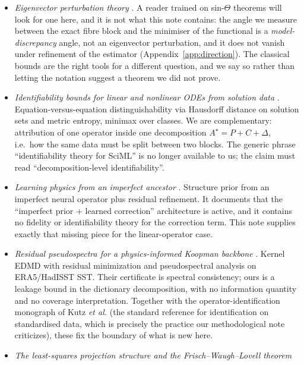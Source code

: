 \documentclass[11pt]{article}
\theoremstyle{remark}
\begin{document}
\begin{itemize}
\cite{welch1974}. None of these is offered as a contribution here; what is offered is that the
amplification factor of the attribution error \emph{is} $1/\sin\alpha$, with constant one.
\item \emph{Eigenvector perturbation theory} \cite{daviskahan1970,wedin1972,kato1995}. A reader
trained on sin-$\Theta$ theorems will look for one here, and it is not what this note contains: the
angle we measure between the exact fibre block and the minimiser of the functional is a
\emph{model-discrepancy} angle, not an eigenvector perturbation, and it does not vanish under
refinement of the estimator (Appendix~\ref{app:direction}). The classical bounds are the right
tools for a different question, and we say so rather than letting the notation suggest a theorem we
did not prove.
\item \emph{Identifiability bounds for linear and nonlinear ODEs from solution data}
\cite{pan2026}. Equation-versus-equation distinguishability via
Hausdorff distance on solution sets and metric entropy, minimax over classes. We are
complementary: attribution of one operator inside one decomposition
$A^\star=P+C+\Delta$, i.e.\ how the same data must be split between two blocks. The
generic phrase ``identifiability theory for SciML'' is no longer available to us; the
claim must read ``decomposition-level identifiability''.
\item \emph{Learning physics from an imperfect ancestor} \cite{mousavi2026}. Structure prior from an
imperfect neural operator plus residual refinement. It
documents that the ``imperfect prior $+$ learned correction'' architecture is active, and
it contains no fidelity or identifiability theory for the correction term. This note
supplies exactly that missing piece for the linear-operator case.
\item \emph{Residual pseudospectra for a physics-informed Koopman backbone}
\cite{lorenzo2026}. Kernel EDMD with residual minimization and
pseudospectral analysis on ERA5/HadISST SST. Their certificate is spectral consistency;
ours is a leakage bound in the dictionary decomposition, with no information quantity and
no coverage interpretation. Together with the operator-identification monograph of Kutz
\emph{et al.} \cite{kutz2016} (the standard reference for identification on standardised data,
which is precisely the practice our methodological note criticizes), these fix the
boundary of what is new here.
\item \emph{The least-squares projection structure and the Frisch--Waugh--Lovell theorem}

\end{itemize}
\end{document}
